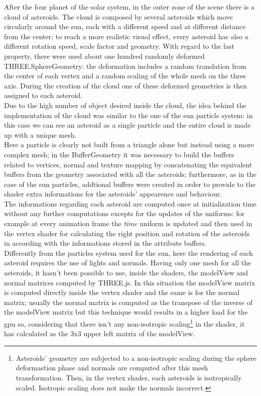 \documentclass[paper=a4, fontsize=11pt]{scrartcl} %
\numberwithin{equation}{section} %
\numberwithin{figure}{section} %
\numberwithin{table}{section} %
\theoremstyle{definition}
\begin{document}
After the four planet of the solar system, in the outer zone of the scene there is a cloud of asteroids. The cloud is composed by several asteroids which move circularly around the sun, each with a different speed and at different distance from the center; to reach a more realistic visual effect, every asteroid has also a different rotation speed, scale factor and geometry. With regard to the last property, there were used about one hundred randomly deformed THREE.SphereGeometry: the deformation includes a random translation from the center of each vertex and a random scaling of the whole mesh on the three axis. During the creation of the cloud one of these deformed geometries is then assigned to each asteroid.\\
Due to the high number of object desired inside the cloud, the idea behind the implementation of the cloud was similar to the one of the sun particle system: in this case we can see an asteroid as a single particle and the entire cloud is made up with a unique mesh.\\
Here a particle is clearly not built from a triangle alone but instead using a more complex mesh; in the BufferGeometry it was necessary to build the buffers related to vertices, normal and texture mapping by concatenating the equivalent buffers from the geometry associated with all the asteroids; furthermore, as in the case of the sun particles, addtional buffers were created in order to provide to the shader extra informations for the asteroids' appearence and behaviour.\\
The informations regarding each asteroid are computed once at initialization time without any further computations excepts for the updates of the uniforms: for example at every animation frame the \textit{time} uniform is updated and then used in the vertex shader for calculating the right position and rotation of the asteroids in according with the informations stored in the attribute buffers.\\
Differently from the particles system used for the sun, here the rendering of each asteroid requires the use of lights and normals. Having only one mesh for all the asteroids, it hasn't been possible to use, inside the shaders, the modelView and normal matrices computed by THREE.js. In this situation the modelView matrix is computed directly inside the vertex shader and the same is for the normal matrix; usually the normal matrix is computed as the transpose of the inverse of the modelView matrix but this technique would results in a higher load for the gpu so, considering that there isn't any non-isotropic scaling\footnote{Asteroids' geometry are subjected to a non-isotropic scaling during the sphere deformastion phase and normals are computed after this mesh transformation. Then, in the vertex shader, each asteroids is isotropically scaled. Isotropic scaling does not make the normals incorrect.} in the shader, it has calculated as the 3x3 upper left matrix of the modelView.\\
\end{document}
